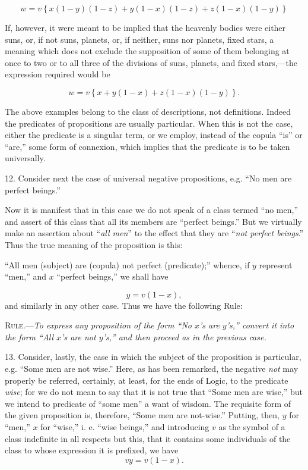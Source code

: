 \documentclass[oneside]{book}
\begin{document}
\[
w = v \left\{ x \left( 1 - y \right) \left( 1 - z \right)%
  + y \left( 1 - x \right) \left( 1 - z \right)%
  + z \left( 1 - x \right) \left( 1 - y \right) \right\}
\]

If, however, it were meant to be implied that the heavenly
bodies were either suns, or, if not suns, planets, or, if neither, suns
nor planets, fixed stars, a meaning which does not exclude the
supposition of some of them belonging at once to two or to all
three of the divisions of suns, planets, and fixed stars,---the expression
required would be

\begin{equation}
w = v \left\{ x + y \left( 1 - x \right)%
  + z \left( 1 - x \right) \left(1 -y \right) \right\}.
\end{equation}

The above examples belong to the class of descriptions, not
definitions. Indeed the predicates of propositions are usually
particular. When this is not the case, either the predicate is a
singular term, or we employ, instead of the copula ``is'' or ``are,''
some form of connexion, which implies that the predicate is to be
taken universally.

12. Consider next the case of universal negative propositions,
e.g. ``No men are perfect beings.''

Now it is manifest that in this case we do not speak of a class
termed ``no men,'' and assert of this class that all its members
are ``perfect beings.'' But we virtually make an assertion about
``\textit{all men}'' to the effect that they are ``\textit{not perfect beings}.'' Thus
the true meaning of the proposition is this:

``All men (subject) are (copula) not perfect (predicate);''
whence, if $y$ represent ``men,'' and $x$ ``perfect beings,'' we shall
have

\[
y = v \left( 1 - x \right),
\]
and similarly in any other case. Thus we have the following
Rule:

\textsc{Rule}.---\textit{To express any proposition of the form ``No $x$'s are
$y$'s,'' convert it into the form ``All $x$'s are not $y$'s,'' and then proceed
as in the previous case.}

13. Consider, lastly, the case in which the subject of the
proposition is particular, e.g. ``Some men are not wise.'' Here,
as has been remarked, the negative \textit{not} may properly be referred,
certainly, at least, for the ends of Logic, to the predicate \textit{wise};
for we do not mean to say that it is not true that ``Some men
are wise,'' but we intend to predicate of ``some men'' a want of
wisdom. The requisite form of the given proposition is, therefore,
``Some men are not-wise.'' Putting, then, $y$ for ``men,''
$x$ for ``wise,'' i. e. ``wise beings,'' and introducing $v$ as the symbol
of a class indefinite in all respects but this, that it contains
some individuals of the class to whose expression it is prefixed,
we have
\[
v y = v \left( 1 - x \right).
\]
\end{document}
